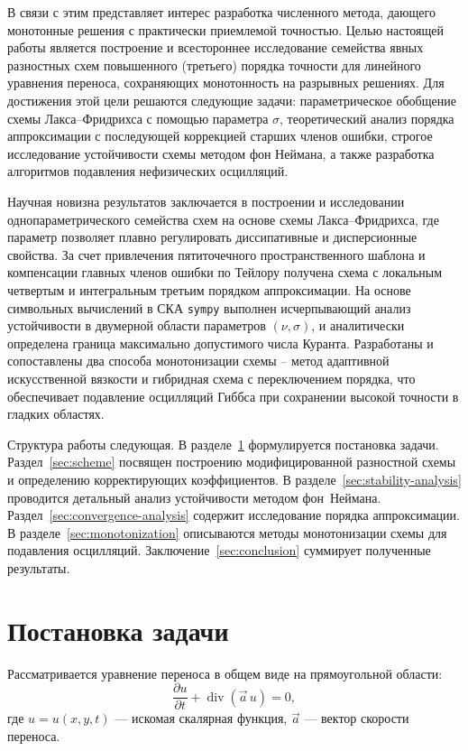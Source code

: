 \documentclass[14pt]{report}
\begin{document}
В связи с этим представляет интерес разработка численного метода, дающего монотонные решения с практически приемлемой точностью. Целью настоящей работы является построение и всестороннее исследование семейства явных разностных схем повышенного (третьего) порядка точности для линейного уравнения переноса, сохраняющих монотонность на разрывных решениях. Для достижения этой цели решаются следующие задачи: параметрическое обобщение схемы Лакса--Фридрихса с помощью параметра $\sigma$, теоретический анализ порядка аппроксимации с последующей коррекцией старших членов ошибки, строгое исследование устойчивости схемы методом фон Неймана, а также разработка алгоритмов подавления нефизических осцилляций.

Научная новизна результатов заключается в построении и исследовании однопараметрического семейства схем на основе схемы Лакса--Фридрихса, где параметр позволяет плавно регулировать диссипативные и дисперсионные свойства. За счет привлечения пятиточечного пространственного шаблона и компенсации главных членов ошибки по Тейлору получена схема с локальным четвертым и интегральным третьим порядком аппроксимации. На основе символьных вычислений в СКА \texttt{sympy} выполнен исчерпывающий анализ устойчивости в двумерной области параметров $(\nu,\sigma)$, и аналитически определена граница максимально допустимого числа Куранта. Разработаны и сопоставлены два способа монотонизации схемы -- метод адаптивной искусственной вязкости и гибридная схема с переключением порядка, что обеспечивает подавление осцилляций Гиббса при сохранении высокой точности в гладких областях.

Структура работы следующая. В разделе~\ref{sec:problem} формулируется постановка задачи. Раздел~\ref{sec:scheme} посвящен построению модифицированной разностной схемы и определению корректирующих коэффициентов. В разделе~\ref{sec:stability-analysis} проводится детальный анализ устойчивости методом фон~\mbox{Неймана}. Раздел~\ref{sec:convergence-analysis} содержит исследование порядка аппроксимации. В разделе~\ref{sec:monotonization} описываются методы монотонизации схемы для подавления осцилляций. Заключение~\ref{sec:conclusion} суммирует полученные результаты.

\chapter{Постановка задачи}
\label{sec:problem}

Рассматривается уравнение переноса в общем виде на прямоугольной области:
\begin{equation}
\frac{\partial u}{\partial t} + \operatorname{div}(\vec{a}\,u) = 0,
\label{eq:transport_general}
\end{equation}
где $u = u(x,y,t)$ --- искомая скалярная функция, $\vec{a}$ --- вектор скорости переноса.
\end{document}
